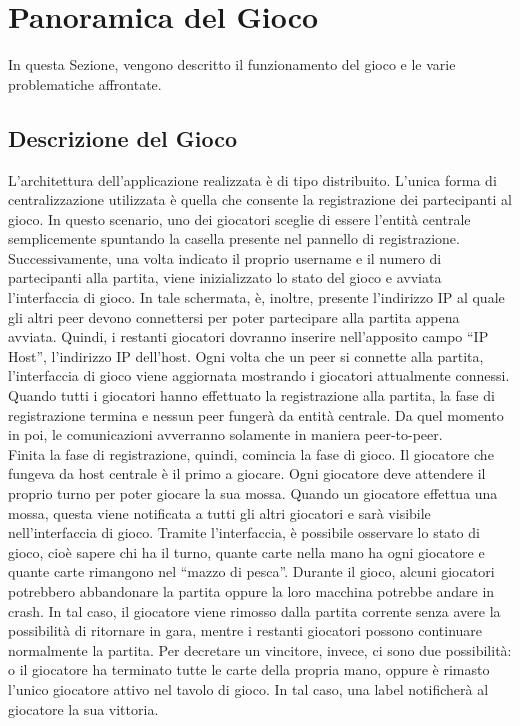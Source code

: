 \documentclass[11pt]{article} %
\begin{document}
\section{Panoramica del Gioco}
In questa Sezione, vengono descritto il funzionamento del gioco e le varie problematiche affrontate.

\subsection{Descrizione del Gioco}
L'architettura dell'applicazione realizzata è di tipo distribuito. L'unica forma di centralizzazione utilizzata è quella che consente la registrazione dei 
partecipanti al gioco. In questo scenario, uno dei giocatori sceglie di essere l'entità centrale semplicemente spuntando la casella presente nel pannello 
di registrazione. Successivamente, una volta indicato il proprio username e il numero di partecipanti alla partita, viene inizializzato lo stato del gioco e
avviata l'interfaccia di gioco. In tale schermata, è, inoltre, presente l'indirizzo IP al quale gli altri peer devono connettersi per poter partecipare alla 
partita appena avviata. Quindi, i restanti giocatori dovranno inserire nell'apposito campo ``IP Host'', l'indirizzo IP dell'host. Ogni volta che un peer si
connette alla partita, l'interfaccia di gioco viene aggiornata mostrando i giocatori attualmente connessi. Quando tutti i giocatori hanno effettuato la 
registrazione alla partita, la fase di registrazione termina e nessun peer fungerà da entità centrale. Da quel momento in poi, le comunicazioni avverranno 
solamente in maniera peer-to-peer.\\
Finita la fase di registrazione, quindi, comincia la fase di gioco. Il giocatore che fungeva da host centrale è il primo a giocare. Ogni giocatore deve 
attendere il proprio turno per poter giocare la sua mossa. Quando un giocatore effettua una mossa, questa viene notificata a tutti gli altri giocatori e 
sarà visibile nell'interfaccia di gioco. Tramite l'interfaccia, è possibile osservare lo stato di gioco, cioè sapere chi ha il turno, quante carte nella 
mano ha ogni giocatore e quante carte rimangono nel ``mazzo di pesca''. Durante il gioco, alcuni giocatori potrebbero abbandonare la partita oppure
la loro macchina potrebbe andare in crash. In tal caso, il giocatore viene rimosso dalla partita corrente senza avere la possibilità di ritornare in gara, 
mentre i restanti giocatori possono continuare normalmente la partita. Per decretare un vincitore, invece, ci sono due possibilità: 
o il giocatore ha terminato tutte le carte della propria mano, oppure è rimasto l'unico giocatore attivo nel tavolo di gioco. 
In tal caso, una label notificherà al giocatore la sua vittoria.
\end{document}
